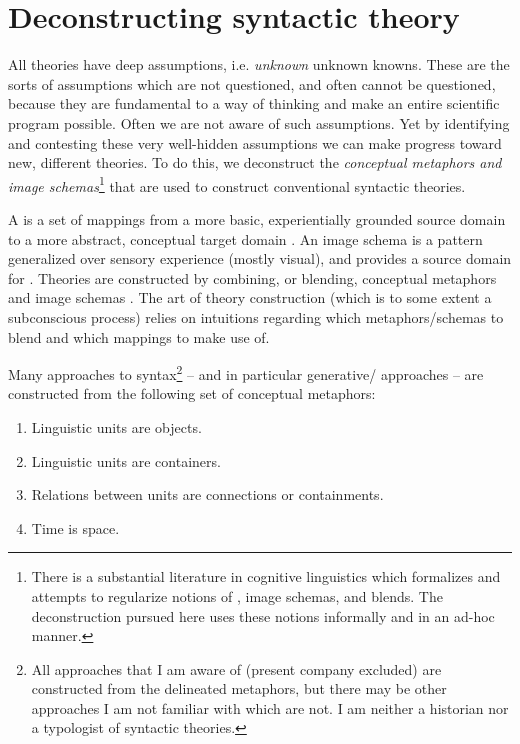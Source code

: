 \chapter{Deconstructing syntactic theory}

All theories have deep assumptions, i.e. \textit{unknown} unknown knowns. These are the sorts of assumptions which are not questioned, and often cannot be questioned, because they are fundamental to a way of thinking and make an entire scientific program possible. Often we are not aware of such assumptions. Yet by identifying and contesting these very well-hidden assumptions we can make progress toward new, different theories. To do this, we deconstruct the \textit{conceptual metaphors and image schemas}\footnote{There is a substantial literature in cognitive linguistics which formalizes and attempts to regularize notions of , image schemas, and blends. The deconstruction pursued here uses these notions informally and in an ad-hoc manner.} that are used to construct conventional syntactic theories. 

  A  is a set of mappings from a more basic, experientially grounded source domain to a more abstract, conceptual target domain \citep{Lakoff1990,Lakoff1993,Lakoff2008,LakoffJohnson1980a,LakoffJohnson1980b,LakoffJohnson1999}. An image schema is a pattern generalized over sensory experience (mostly visual), and provides a source domain for  \citep{ClausnerCroft1999,FauconnierTurner1996,FauconnierTurner2008,GibbsColston1995,GradyEtAl1999,Langacker2002,Oakley2007,Talmy1983,Talmy1988}. Theories are constructed by combining, or blending, conceptual metaphors and image schemas \citep{FauconnierTurner1996,FauconnierTurner2008,GradyEtAl1999,LakoffNúñez2000}. The art of theory construction (which is to some extent a subconscious process) relies on intuitions regarding which metaphors/schemas to blend and which mappings to make use of.

  Many approaches to syntax\footnote{All approaches that I am aware of (present company excluded) are constructed from the delineated metaphors, but there may be other approaches I am not familiar with which are not. I am neither a historian nor a typologist of syntactic theories.} -- and in particular generative/ approaches -- are constructed from the following set of conceptual metaphors: 

\begin{enumerate}
\item Linguistic units are objects.
\item Linguistic units are containers.
\item Relations between units are connections or containments.
\item Time is space.
\end{enumerate}

